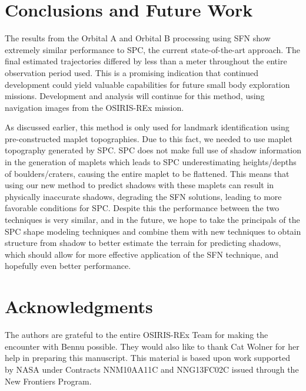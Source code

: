 \documentclass{RPI-SIW}
\begin{document}
\section*{Conclusions and Future Work}
The results from the Orbital A and Orbital B processing using SFN show extremely similar performance to SPC, the current state-of-the-art approach.  The final estimated trajectories differed by less than a meter throughout the entire observation period used.  This is a promising indication that continued development could yield valuable capabilities for future small body exploration missions.  Development and analysis will continue for this method, using navigation images from the OSIRIS-REx mission.

As discussed earlier, this method is only used for landmark identification using pre-constructed maplet topographies.  Due to this fact, we needed to use maplet topography generated by SPC.  SPC does not make full use of shadow information in the generation of maplets which leads to SPC underestimating heights/depths of boulders/craters, causing the entire maplet to be flattened.  This means that using our new method to predict shadows with these maplets can result in physically inaccurate shadows, degrading the SFN solutions, leading to more favorable conditions for SPC.  Despite this the performance between the two techniques is very similar, and in the future, we hope to take the principals of the SPC shape modeling techniques and combine them with new techniques to obtain structure from shadow to better estimate the terrain for predicting shadows, which should allow for more effective application of the SFN technique, and hopefully even better performance. 

\section*{Acknowledgments}
The authors are grateful to the entire OSIRIS-REx Team for making the encounter with Bennu possible.
They would also like to thank Cat Wolner for her help in preparing this manuscript.
This material is based upon work supported by NASA under Contracts NNM10AA11C and NNG13FC02C issued through the New Frontiers Program. 

\vspace{3pt}

\titleformat{\section}[runin]{\normalsize\bfseries}{\thesection}{0em}{\addperiod}
{\footnotesize }

\end{document}
